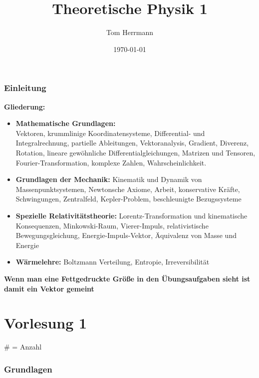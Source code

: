 \documentclass[11pt]{article}
\title{Theoretische Physik 1}
\date{\today}
\begin{document}
\lstset{language=Java}
\author{Tom Herrmann}
\linespread{1.55}
\maketitle
 
\tableofcontents
\newpage

\section{Einleitung}
	\textbf{Gliederung:}
	\begin{itemize}
		\item \textbf{Mathematische Grundlagen:}\\Vektoren, krummlinige Koordinatensysteme, Differential- und Integralrechnung, partielle Ableitungen, Vektoranalysis, Gradient, Diverenz, Rotation, lineare gewöhnliche Differentialgleichungen, Matrizen und Tensoren, Fourier-Transformation, komplexe Zahlen, Wahrscheinlichkeit.
		\item \textbf{Grundlagen der Mechanik:} Kinematik und Dynamik von Massenpunktsystemen, Newtonsche Axiome, Arbeit, konservative Kräfte, Schwingungen, Zentralfeld, Kepler-Problem, beschleunigte Bezugssysteme
		\item \textbf{Spezielle Relativitätstheorie:}  Lorentz-Transformation und kinematische Konsequenzen, Minkowski-Raum, Vierer-Impuls, relativistische Bewegungsgleichung, Energie-Impuls-Vektor, Äquivalenz von Masse und Energie
		\item \textbf{Wärmelehre: } Boltzmann Verteilung, Entropie, Irreversibilität
	\end{itemize}
		\textbf{Wenn man eine Fettgedruckte Größe in den Übungsaufgaben sieht ist damit ein Vektor gemeint}
\part{Vorlesung 1}
	$\#$ = Anzahl
	\section{Grundlagen}
\end{document}

